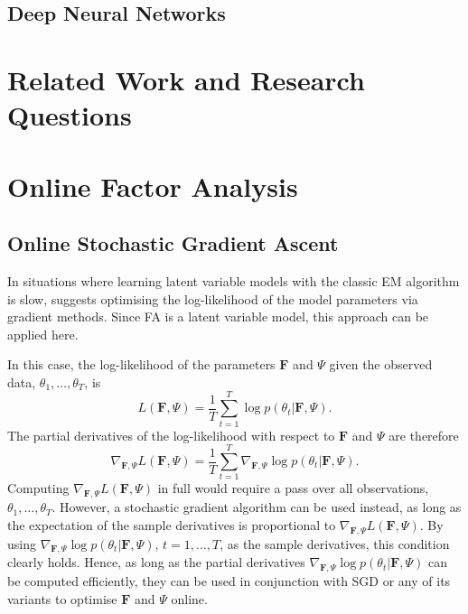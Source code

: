 \documentclass[msc,deptreport.inf]{infthesis} %
\newcommand{\matr}[1]{\mathbf{#1}}
\begin{document}
\section{Deep Neural Networks}\label{sec:dnns}


\chapter{Related Work and Research Questions}\label{ch:previous_work}


\chapter{Online Factor Analysis}\label{ch:online_fa}


\section{Online Stochastic Gradient Ascent}\label{sec:gradient_fa}

In situations where learning latent variable models with the classic EM algorithm is slow, \cite{barber2007} suggests optimising the log-likelihood of the model parameters via gradient methods. Since FA is a latent variable model, this approach can be applied here. 

In this case, the log-likelihood of the parameters $\matr{F}$ and $\Psi$ given the observed data, $\theta_1,\dots,\theta_T$, is 
\begin{equation}
	L(\matr{F}, \Psi) = \frac{1}{T} \sum_{t=1}^T \log p(\theta_t | \matr{F}, \Psi).
\end{equation}
The partial derivatives of the log-likelihood with respect to $\matr{F}$ and $\Psi$ are therefore
\begin{equation}
	\nabla_{\matr{F}, \Psi} L(\matr{F}, \Psi) = \frac{1}{T} \sum_{t=1}^T \nabla_{\matr{F}, \Psi} \log p(\theta_t | \matr{F}, \Psi).
\end{equation}
Computing $\nabla_{\matr{F}, \Psi} L(\matr{F}, \Psi)$ in full would require a pass over all observations, $\theta_1, \dots, \theta_T$. However, a stochastic gradient algorithm can be used instead, as long as the expectation of the sample derivatives is proportional to $\nabla_{\matr{F}, \Psi} L(\matr{F}, \Psi)$. By using $\nabla_{\matr{F}, \Psi} \log p(\theta_t | \matr{F}, \Psi)$, $t=1,\dots,T$, as the sample derivatives, this condition clearly holds. Hence, as long as the partial derivatives $\nabla_{\matr{F}, \Psi} \log p(\theta_t | \matr{F}, \Psi)$ can be computed efficiently, they can be used in conjunction with SGD or any of its variants to optimise $\matr{F}$ and $\Psi$ online. 
\end{document}
